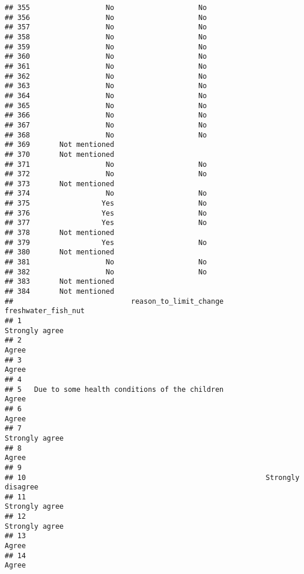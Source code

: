 \documentclass[
]{article}
\begin{document}
\begin{verbatim}
## 355                  No                    No
## 356                  No                    No
## 357                  No                    No
## 358                  No                    No
## 359                  No                    No
## 360                  No                    No
## 361                  No                    No
## 362                  No                    No
## 363                  No                    No
## 364                  No                    No
## 365                  No                    No
## 366                  No                    No
## 367                  No                    No
## 368                  No                    No
## 369       Not mentioned                      
## 370       Not mentioned                      
## 371                  No                    No
## 372                  No                    No
## 373       Not mentioned                      
## 374                  No                    No
## 375                 Yes                    No
## 376                 Yes                    No
## 377                 Yes                    No
## 378       Not mentioned                      
## 379                 Yes                    No
## 380       Not mentioned                      
## 381                  No                    No
## 382                  No                    No
## 383       Not mentioned                      
## 384       Not mentioned                      
##                            reason_to_limit_change        freshwater_fish_nut
## 1                                                             Strongly agree
## 2                                                                      Agree
## 3                                                                      Agree
## 4                                                                           
## 5   Due to some health conditions of the children                      Agree
## 6                                                                      Agree
## 7                                                             Strongly agree
## 8                                                                      Agree
## 9                                                                           
## 10                                                         Strongly disagree
## 11                                                            Strongly agree
## 12                                                            Strongly agree
## 13                                                                     Agree
## 14                                                                     Agree

\end{verbatim}
\end{document}
